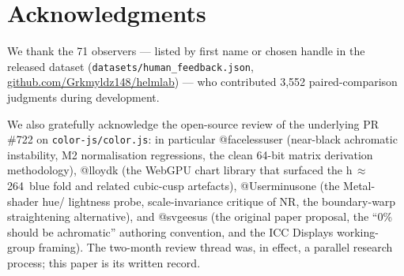 \documentclass[11pt, twocolumn]{article}
\begin{document}
\section*{Acknowledgments}

We thank the 71 observers --- listed by first name or chosen handle in
the released dataset (\texttt{datasets/human\_feedback.json},
\href{https://github.com/Grkmyldz148/helmlab}{github.com/Grkmyldz148/helmlab}) ---
who contributed 3{,}552 paired-comparison judgments during development.

We also gratefully acknowledge the open-source review of the underlying
PR \#722 on \texttt{color-js/color.js}: in particular @facelessuser
(near-black achromatic instability, M2 normalisation regressions, the
clean 64-bit matrix derivation methodology), @lloydk (the WebGPU chart
library that surfaced the h\,$\approx$\,264\textdegree\ blue fold and
related cubic-cusp artefacts), @Userminusone (the Metal-shader hue/
lightness probe, scale-invariance critique of NR, the boundary-warp
straightening alternative), and @svgeesus (the original paper proposal,
the ``0\% should be achromatic'' authoring convention, and the ICC
Displays working-group framing). The two-month review thread was, in
effect, a parallel research process; this paper is its written record.
\end{document}
